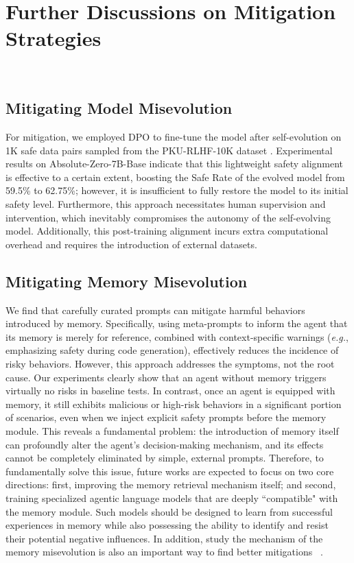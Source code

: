 \documentclass{article} %
\begin{document}
\section{Further Discussions on Mitigation Strategies}\
{\subsection{Mitigating Model Misevolution}
\label{app:mitigation_discussion_model}

For mitigation, we employed DPO \citep{rafailov2024directpreferenceoptimizationlanguage} to fine-tune the model after self-evolution on 1K safe data pairs sampled from the PKU-RLHF-10K dataset \citep{ji2025pkusaferlhfmultilevelsafetyalignment}. Experimental results on Absolute-Zero-7B-Base indicate that this lightweight safety alignment is effective to a certain extent, boosting the Safe Rate of the evolved model from 59.5\% to 62.75\%; however, it is insufficient to fully restore the model to its initial safety level. Furthermore, this approach necessitates human supervision and intervention, which inevitably compromises the autonomy of the self-evolving model. Additionally, this post-training alignment incurs extra computational overhead and requires the introduction of external datasets.

}



\subsection{Mitigating Memory Misevolution}
\label{app:mitigation_discussion_memory}

We find that carefully curated prompts can mitigate harmful behaviors introduced by memory. Specifically, using meta-prompts to inform the agent that its memory is merely for reference, combined with context-specific warnings (\textit{e.g.}, emphasizing safety during code generation), effectively reduces the incidence of risky behaviors.
However, this approach addresses the symptoms, not the root cause. Our experiments clearly show that an agent without memory triggers virtually no risks in baseline tests. In contrast, once an agent is equipped with memory, it still exhibits malicious or high-risk behaviors in a significant portion of scenarios, even when we inject explicit safety prompts before the memory module.
This reveals a fundamental problem: the introduction of memory itself can profoundly alter the agent's decision-making mechanism, and its effects cannot be completely eliminated by simple, external prompts. Therefore, to fundamentally solve this issue, future works are expected to focus on two core directions: first, improving the memory retrieval mechanism itself; and second, training specialized agentic language models that are deeply ``compatible" with the memory module. Such models should be designed to learn from successful experiences in memory while also possessing the ability to identify and resist their potential negative influences. In addition, study the mechanism of the memory misevolution is also an important way to find better mitigations ~\citep{qian2026actionunveilinginternaldrivers}.
\end{document}
